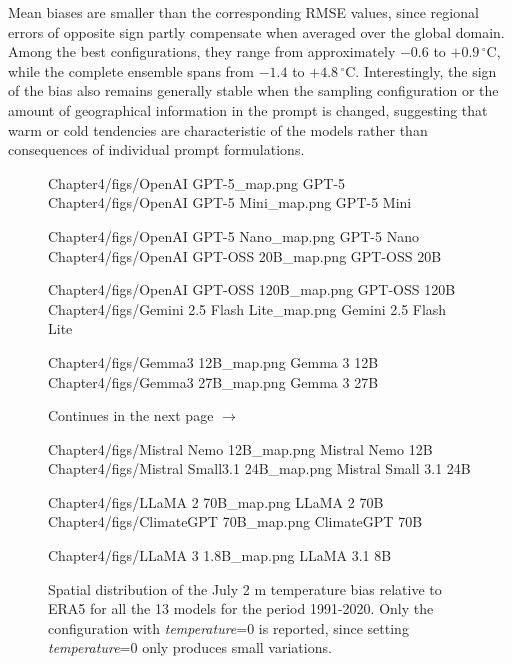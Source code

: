 Mean biases are smaller than the corresponding RMSE values, since regional errors of opposite sign partly compensate when averaged over the global domain. Among the best configurations, they range from approximately \(-0.6\) to \(+0.9\,^{\circ}\mathrm{C}\), while the complete ensemble spans from \(-1.4\) to \(+4.8\,^{\circ}\mathrm{C}\). Interestingly, the sign of the bias also remains generally stable when the sampling configuration or the amount of geographical information in the prompt is changed, suggesting that warm or cold tendencies are characteristic of the models rather than consequences of individual prompt formulations.

\begin{figure}[p]
    \centering

    \mapmodel
        {Chapter4/figs/OpenAI GPT-5_map.png}
        {GPT-5}
    \hfill
    \mapmodel
        {Chapter4/figs/OpenAI GPT-5 Mini_map.png}
        {GPT-5 Mini}

    \medskip

    \mapmodel
        {Chapter4/figs/OpenAI GPT-5 Nano_map.png}
        {GPT-5 Nano}
    \hfill
    \mapmodel
        {Chapter4/figs/OpenAI GPT-OSS 20B_map.png}
        {GPT-OSS 20B}

    \medskip

    \mapmodel
        {Chapter4/figs/OpenAI GPT-OSS 120B_map.png}
        {GPT-OSS 120B}
    \hfill
    \mapmodel
        {Chapter4/figs/Gemini 2.5 Flash Lite_map.png}
        {Gemini 2.5 Flash Lite}

    \medskip
    
    \mapmodel
        {Chapter4/figs/Gemma3 12B_map.png}
        {Gemma 3 12B}
    \hfill
    \mapmodel
        {Chapter4/figs/Gemma3 27B_map.png}
        {Gemma 3 27B}

    

    \caption{
        Continues in the next page $\rightarrow$
    }
    \label{fig:temperature-bias-maps}
\end{figure}

\begin{figure}[p]
    \ContinuedFloat
    \centering


    \mapmodel
        {Chapter4/figs/Mistral Nemo 12B_map.png}
        {Mistral Nemo 12B}
    \hfill
    \mapmodel
        {Chapter4/figs/Mistral Small3.1 24B_map.png}
        {Mistral Small 3.1 24B}

    \medskip

    \mapmodel
        {Chapter4/figs/LLaMA 2 70B_map.png}
        {LLaMA 2 70B}
    \hfill
    \mapmodel
        {Chapter4/figs/ClimateGPT 70B_map.png}
        {ClimateGPT 70B}

    \medskip

    \mapmodel
        {Chapter4/figs/LLaMA 3 1.8B_map.png}
        {LLaMA 3.1 8B}

    \caption[]{
        Spatial distribution of the July 2 m temperature bias relative to ERA5 for all the 13 models for the period 1991-2020. Only the configuration with \emph{temperature}=0 is reported, since setting \emph{temperature}=0 only produces small variations.
    }
\end{figure}

